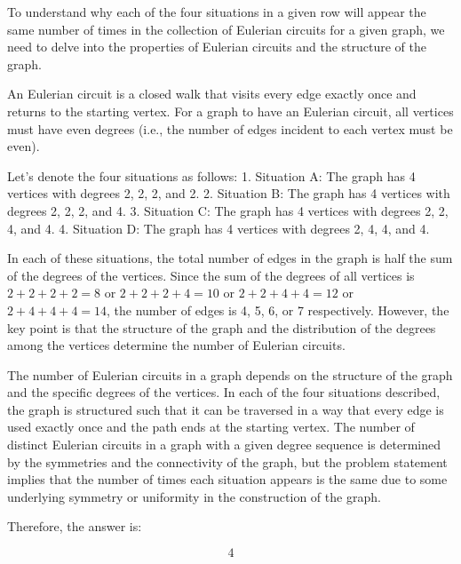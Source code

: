 To understand why each of the four situations in a given row will appear the same number of times in the collection of Eulerian circuits for a given graph, we need to delve into the properties of Eulerian circuits and the structure of the graph.

An Eulerian circuit is a closed walk that visits every edge exactly once and returns to the starting vertex. For a graph to have an Eulerian circuit, all vertices must have even degrees (i.e., the number of edges incident to each vertex must be even).

Let's denote the four situations as follows:
1. Situation A: The graph has 4 vertices with degrees 2, 2, 2, and 2.
2. Situation B: The graph has 4 vertices with degrees 2, 2, 2, and 4.
3. Situation C: The graph has 4 vertices with degrees 2, 2, 4, and 4.
4. Situation D: The graph has 4 vertices with degrees 2, 4, 4, and 4.

In each of these situations, the total number of edges in the graph is half the sum of the degrees of the vertices. Since the sum of the degrees of all vertices is \(2 + 2 + 2 + 2 = 8\) or \(2 + 2 + 2 + 4 = 10\) or \(2 + 2 + 4 + 4 = 12\) or \(2 + 4 + 4 + 4 = 14\), the number of edges is 4, 5, 6, or 7 respectively. However, the key point is that the structure of the graph and the distribution of the degrees among the vertices determine the number of Eulerian circuits.

The number of Eulerian circuits in a graph depends on the structure of the graph and the specific degrees of the vertices. In each of the four situations described, the graph is structured such that it can be traversed in a way that every edge is used exactly once and the path ends at the starting vertex. The number of distinct Eulerian circuits in a graph with a given degree sequence is determined by the symmetries and the connectivity of the graph, but the problem statement implies that the number of times each situation appears is the same due to some underlying symmetry or uniformity in the construction of the graph.

Therefore, the answer is:

\[
\boxed{4}
\]